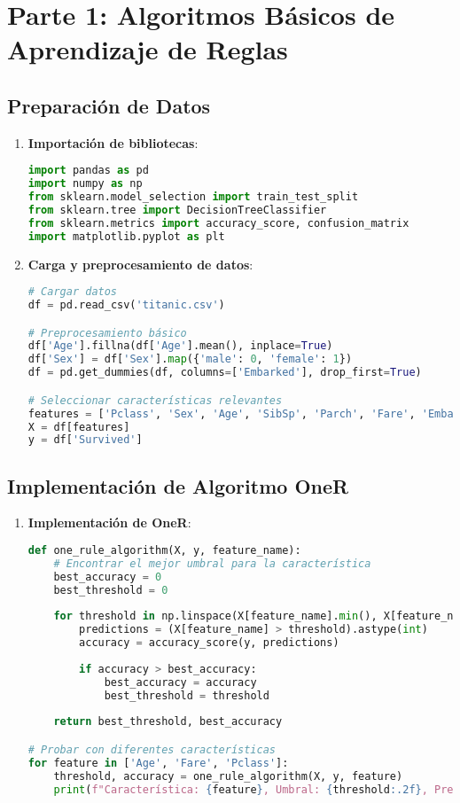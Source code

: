 \documentclass[a4paper,12pt]{article}
\begin{document}
\section{Parte 1: Algoritmos Básicos de Aprendizaje de Reglas}

\subsection{Preparación de Datos}
\begin{enumerate}
    \item \textbf{Importación de bibliotecas}: 
    \begin{lstlisting}[language=Python]
import pandas as pd
import numpy as np
from sklearn.model_selection import train_test_split
from sklearn.tree import DecisionTreeClassifier
from sklearn.metrics import accuracy_score, confusion_matrix
import matplotlib.pyplot as plt
    \end{lstlisting}
    
    \item \textbf{Carga y preprocesamiento de datos}:
    \begin{lstlisting}[language=Python]
# Cargar datos
df = pd.read_csv('titanic.csv')

# Preprocesamiento básico
df['Age'].fillna(df['Age'].mean(), inplace=True)
df['Sex'] = df['Sex'].map({'male': 0, 'female': 1})
df = pd.get_dummies(df, columns=['Embarked'], drop_first=True)

# Seleccionar características relevantes
features = ['Pclass', 'Sex', 'Age', 'SibSp', 'Parch', 'Fare', 'Embarked_Q', 'Embarked_S']
X = df[features]
y = df['Survived']
    \end{lstlisting}
\end{enumerate}

\subsection{Implementación de Algoritmo OneR}
\begin{enumerate}
    \item \textbf{Implementación de OneR}:
    \begin{lstlisting}[language=Python]
def one_rule_algorithm(X, y, feature_name):
    # Encontrar el mejor umbral para la característica
    best_accuracy = 0
    best_threshold = 0
    
    for threshold in np.linspace(X[feature_name].min(), X[feature_name].max(), 100):
        predictions = (X[feature_name] > threshold).astype(int)
        accuracy = accuracy_score(y, predictions)
        
        if accuracy > best_accuracy:
            best_accuracy = accuracy
            best_threshold = threshold
    
    return best_threshold, best_accuracy

# Probar con diferentes características
for feature in ['Age', 'Fare', 'Pclass']:
    threshold, accuracy = one_rule_algorithm(X, y, feature)
    print(f"Característica: {feature}, Umbral: {threshold:.2f}, Precisión: {accuracy:.2f}")
    \end{lstlisting}
\end{enumerate}
\end{document}
